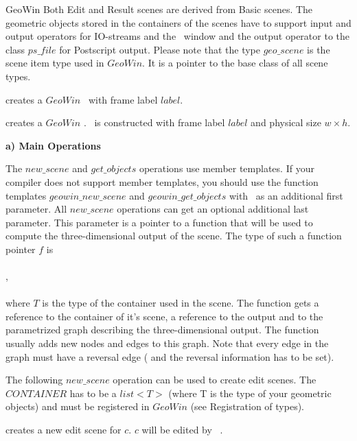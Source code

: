 \begin{ccRefClass}{GeoWin}
Both Edit and Result scenes are derived from Basic scenes.
The geometric objects stored in the containers of the scenes have to support input and
output operators for IO-streams and the \leda\ window and the output operator to the \leda
class $ps\_file$ for Postscript output.    
Please note that the type $geo\_scene$ is the scene item type used in $GeoWin$.
It is a pointer to the base class of all scene types.
    
 
\ccCreation

{creates a $GeoWin$ \ccVar\ with  frame label $label$.}

{creates a $GeoWin$ \ccVar.  \ccVar\ is constructed with 
frame label $label$ and physical size $w\times h$. }

\ccOperations


\medskip
{\bf a) Main Operations} 

The $new\_scene$ and $get\_objects$ operations use member templates. If your 
compiler does not support member templates, you should use 
the function templates $geowin\_new\_scene$ and $geowin\_get\_objects$ with
\ccVar\ as an additional first parameter.
All $new\_scene$ operations can get an optional additional last parameter.
This parameter is a pointer to a function that will be used to compute the
three-dimensional output of the scene.
The type of such a function pointer $f$ is \\
\\
,\\
\\
where $T$ is the type of the container used in the scene.
The function gets a reference to the container of it's scene, a reference to the
output  and to the parametrized graph describing the three-dimensional
output. The function usually adds new nodes and edges to this graph. Note that
every edge in the graph must have a reversal edge ( and the reversal information
has to be set).
    
The following $new\_scene$ operation can be used to create edit scenes.
The $CONTAINER$ has to be a $list<T>$ (where T is the type of your geometric
objects) and must be registered in $GeoWin$ (see Registration of types).

{creates a new edit scene for $c$. $c$ will be edited by \ccVar\ . }


\end{ccRefClass}
